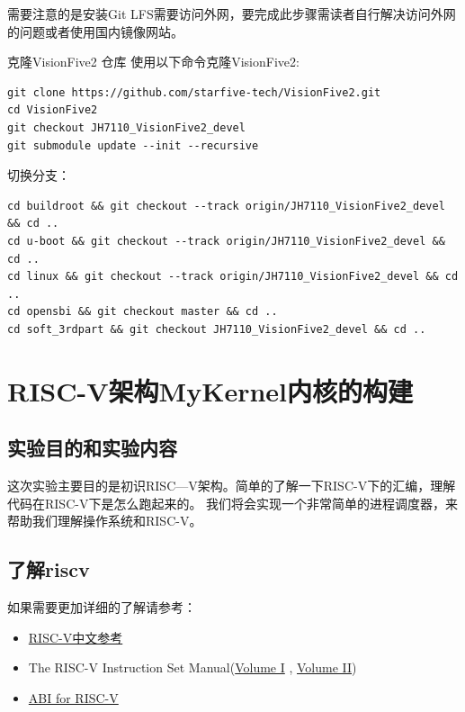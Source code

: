 \documentclass[lang=cn,10pt]{elegantbook}
\begin{document}
需要注意的是安装Git LFS需要访问外网，要完成此步骤需读者自行解决访问外网的问题或者使用国内镜像网站。

克隆VisionFive2 仓库
使用以下命令克隆VisionFive2:

\begin{lstlisting}
git clone https://github.com/starfive-tech/VisionFive2.git
cd VisionFive2
git checkout JH7110_VisionFive2_devel
git submodule update --init --recursive
\end{lstlisting}

切换分支：

\begin{lstlisting}
cd buildroot && git checkout --track origin/JH7110_VisionFive2_devel && cd ..
cd u-boot && git checkout --track origin/JH7110_VisionFive2_devel && cd ..
cd linux && git checkout --track origin/JH7110_VisionFive2_devel && cd ..
cd opensbi && git checkout master && cd ..
cd soft_3rdpart && git checkout JH7110_VisionFive2_devel && cd ..
\end{lstlisting}

\section{RISC-V架构MyKernel内核的构建}
\subsection{实验目的和实验内容}
这次实验主要目的是初识RISC—V架构。简单的了解一下RISC-V下的汇编，理解代码在RISC-V下是怎么跑起来的。
我们将会实现一个非常简单的进程调度器，来帮助我们理解操作系统和RISC-V。

\subsection{了解riscv}
如果需要更加详细的了解请参考：

\begin{itemize}
  \item \href{http://riscvbook.com/chinese/RISC-V-Reader-Chinese-v2p1.pdf}{RISC-V中文参考}
  \item The RISC-V Instruction Set Manual(\href{https://github.com/riscv/riscv-isa-manual/releases/download/Priv-v1.12/riscv-privileged-20211203.pdf}{Volume I} , \href{https://github.com/riscv/riscv-isa-manual/releases/download/Ratified-IMAFDQC/riscv-spec-20191213.pdf}{Volume II})
  \item \href{https://github.com/riscv-non-isa/riscv-elf-psabi-doc}{ABI for RISC-V}
\end{itemize}
\end{document}
